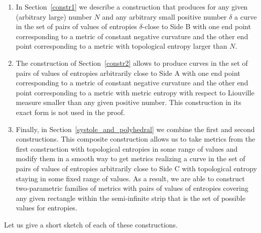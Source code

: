 \documentclass[12pt]{article}
\numberwithin{equation}{section}
\theoremstyle{definition}
\begin{document}
\begin{enumerate}

\item In Section~\ref{constr1}  we describe  a construction  that produces for any given (arbitrary large) number $N$  and any arbitrary small positive number $\delta$ a curve in the set of pairs of values of entropies $\delta$-close to Side B with one end point corresponding to a metric of constant negative curvature and the other end point corresponding to a metric with topological entropy larger than $N$. 

\item The construction of Section~\ref{constr2} allows to produce curves in the set of pairs of values of entropies arbitrarily close to Side A with one end point corresponding to a metric of constant negative curvature and the other end point corresponding to a metric with metric entropy with respect to Liouville measure smaller than any given positive  number. This construction in its exact form is not used in the proof.

\item  Finally,  in Section~\ref{systole_and_polyhedral} we  combine the first and second constructions. This composite construction allows us to take metrics from the first construction with topological entropies in some range of values and modify them in a smooth way to get metrics realizing a curve in the set of pairs of values of entropies arbitrarily close to Side C with topological entropy staying in some fixed range of values. As a result, we are able to construct two-parametric families of metrics with pairs of values of entropies covering any given rectangle within the semi-infinite strip that is the set of possible values for entropies.
\end{enumerate}

Let us give a short sketch of each of these constructions.
\bigskip
\end{document}
